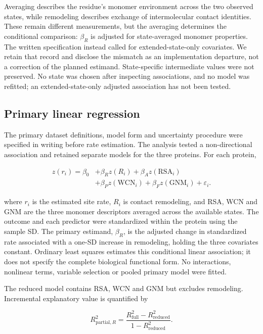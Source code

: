 \documentclass[11pt,a4paper]{article}
\begin{document}
Averaging describes the residue's monomer environment across the two observed states, while remodeling describes exchange of intermolecular contact identities. These remain different measurements, but the averaging determines the conditional comparison: \(\beta_R\) is adjusted for state-averaged monomer properties. The written specification instead called for extended-state-only covariates. We retain that record and disclose the mismatch as an implementation departure, not a correction of the planned estimand. State-specific intermediate values were not preserved. No state was chosen after inspecting associations, and no model was refitted; an extended-state-only adjusted association has not been tested.

\subsection{Primary linear regression}

The primary dataset definitions, model form and uncertainty procedure were specified in writing before rate estimation. The analysis tested a non-directional association and retained separate models for the three proteins. For each protein,

\begin{equation}
\boxed{\begin{aligned}
z(r_i)=\beta_0 &+\beta_R z(R_i)+\beta_A z(\mathrm{RSA}_i)\\
&+\beta_P z(\mathrm{WCN}_i)+\beta_F z(\mathrm{GNM}_i)+\varepsilon_i .
\end{aligned}}
\label{eq:regression}
\end{equation}

where \(r_i\) is the estimated site rate, \(R_i\) is contact remodeling, and RSA, WCN and GNM are the three monomer descriptors averaged across the available states. The outcome and each predictor were standardized within the protein using the sample SD. The primary estimand, \(\beta_R\), is the adjusted change in standardized rate associated with a one-SD increase in remodeling, holding the three covariates constant. Ordinary least squares estimates this conditional linear association; it does not specify the complete biological functional form. No interactions, nonlinear terms, variable selection or pooled primary model were fitted.

The reduced model contains RSA, WCN and GNM but excludes remodeling. Incremental explanatory value is quantified by

\begin{equation}
R^2_{\mathrm{partial},R}=\frac{R^2_{\mathrm{full}}-R^2_{\mathrm{reduced}}}{1-R^2_{\mathrm{reduced}}}.
\label{eq:partialr2}
\end{equation}
\end{document}
